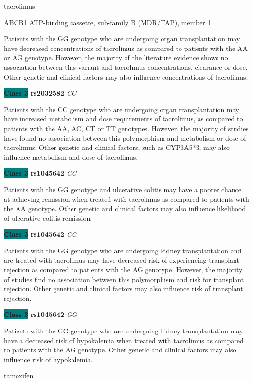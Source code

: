\documentclass{resume} %
\begin{document}
\begin{rSection}{ tacrolimus }
\begin{rSubsection}{ ABCB1 }{ ATP-binding cassette, sub-family B (MDR/TAP), member 1 }{}{}
\item[] Patients with the GG genotype who are undergoing organ transplantation may have decreased concentrations of tacrolimus as compared to patients with the AA or AG genotype. However, the majority of the literature evidence shows no association between this variant and tacrolimus concentrations, clearance or dose. Other genetic and clinical factors may also influence concentrations of tacrolimus. \item \textbf{\colorbox{teal} {Class 3}} \textbf{ rs2032582 } \textit{ CC }
\item[] Patients with the CC genotype who are undergoing organ transplantation may have increased metabolism and dose requirements of tacrolimus, as compared to patients with the AA, AC, CT or TT genotypes. However, the majority of studies have found no association between this polymorphism and metabolism or dose of tacrolimus. Other genetic and clinical factors, such as CYP3A5*3, may also influence metabolism and dose of tacrolimus.\item \textbf{\colorbox{teal} {Class 3}} \textbf{ rs1045642 } \textit{ GG }
\item[] Patients with the GG genotype and ulcerative colitis may have a poorer chance at achieving remission when treated with tacrolimus as compared to patients with the AA genotype. Other genetic and clinical factors may also influence likelihood of ulcerative colitis remission.\item \textbf{\colorbox{teal} {Class 3}} \textbf{ rs1045642 } \textit{ GG }
\item[] Patients with the GG genotype who are undergoing kidney transplantation and are treated with tacrolimus may have decreased risk of experiencing transplant rejection as compared to patients with the AG genotype. However, the majority of studies find no association between this polymorphism and risk for transplant rejection. Other genetic and clinical factors may also influence risk of transplant rejection.\item \textbf{\colorbox{teal} {Class 3}} \textbf{ rs1045642 } \textit{ GG }
\item[] Patients with the GG genotype who are undergoing kidney transplantation may have a decreased risk of hypokalemia when treated with tacrolimus as compared to patients with the AG genotype. Other genetic and clinical factors may also influence risk of hypokalemia.
\end{rSubsection}

\end{rSection}\begin{rSection}{ tamoxifen }
\item[]


\end{rSection}
\end{document}
